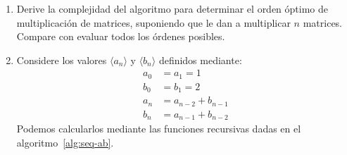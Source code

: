   \begin{enumerate}
  \item
    Derive la complejidad del algoritmo
    para determinar el orden óptimo de multiplicación de matrices,
    suponiendo que le dan a multiplicar \(n\) matrices.
    Compare con evaluar todos los órdenes posibles.
  \item
    Considere los valores \(\langle a_n \rangle\) y \(\langle b_n \rangle\)
    definidos mediante:
    \begin{align*}
      a_0 &= a_1 = 1 \\
      b_0 &= b_1 = 2 \\
      a_n
	&= a_{n - 2} + b_{n - 1} \\
      b_n
	&= a_{n - 1} + b_{n - 2}
    \end{align*}
    Podemos calcularlos mediante las funciones recursivas
    dadas en el algoritmo~\ref{alg:seq-ab}.
    \begin{algorithm}
      \DontPrintSemicolon\Indp



\end{algorithm}
\end{enumerate}

